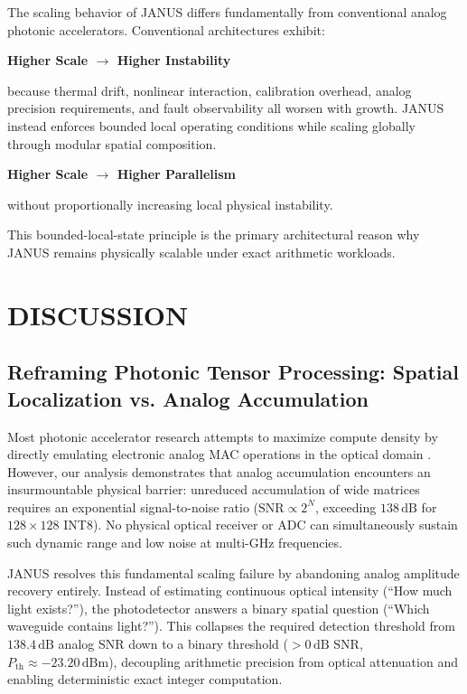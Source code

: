 \documentclass[journal]{IEEEtran}
\begin{document}
The scaling behavior of JANUS differs fundamentally from conventional analog photonic accelerators.
Conventional architectures exhibit:

\textbf{Higher Scale $\rightarrow$ Higher Instability}

because thermal drift, nonlinear interaction, calibration overhead, analog precision requirements, and fault observability all worsen with growth. JANUS instead enforces bounded local operating conditions while scaling globally through modular spatial composition.

\textbf{Higher Scale $\rightarrow$ Higher Parallelism}

without proportionally increasing local physical instability.

This bounded-local-state principle is the primary architectural reason why JANUS remains physically scalable under exact arithmetic workloads.

\section{DISCUSSION}
\label{sec:discussion}

\subsection{\textbf{Reframing Photonic Tensor Processing: Spatial Localization vs. Analog Accumulation}}

Most photonic accelerator research attempts to maximize compute density by directly emulating electronic analog MAC operations in the optical domain \cite{Sorger2018,Feldmann2021,Miscuglio2020,Zhang2025}. However, our analysis demonstrates that analog accumulation encounters an insurmountable physical barrier: unreduced accumulation of wide matrices requires an exponential signal-to-noise ratio ($\mathrm{SNR} \propto 2^N$, exceeding $138\,\mathrm{dB}$ for $128 \times 128$ INT8). No physical optical receiver or ADC can simultaneously sustain such dynamic range and low noise at multi-GHz frequencies.

JANUS resolves this fundamental scaling failure by abandoning analog amplitude recovery entirely. Instead of estimating continuous optical intensity (``How much light exists?''), the photodetector answers a binary spatial question (``Which waveguide contains light?''). This collapses the required detection threshold from $138.4\,\mathrm{dB}$ analog SNR down to a binary threshold ($>0\,\mathrm{dB}$ SNR, $P_{\mathrm{th}} \approx -23.20\,\mathrm{dBm}$), decoupling arithmetic precision from optical attenuation and enabling deterministic exact integer computation.
\end{document}
